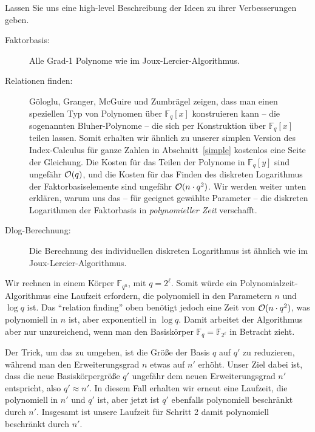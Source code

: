 \begin{refsegment}
Lassen Sie uns eine high-level Beschreibung der Ideen zu ihrer Verbesserungen geben.

\begin{description}
\item[Faktorbasis:] Alle Grad-1 Polynome wie im Joux-Lercier-Algorithmus.

\item[Relationen finden:] G\"ologlu, Granger, McGuire und Zumbr\"agel zeigen, dass man einen speziellen Typ von Polynomen über $\mathbb{F}_q[x]$ konstruieren kann -- die sogenannten Bluher-Polynome -- die sich per Konstruktion über $\mathbb{F}_q[x]$ teilen lassen. Somit erhalten wir ähnlich zu unserer simplen Version des Index-Calculus für ganze Zahlen in Abschnitt~\ref{simple} kostenlos eine Seite der Gleichung. Die Kosten für das Teilen der Polynome in $\mathbb{F}_q[y]$ sind ungefähr ${\cal O}(q)$, und die Kosten für das Finden des diskreten Logarithmus der Faktorbasiselemente sind ungefähr ${\cal O}(n \cdot q^2)$. Wir werden weiter unten erklären, warum uns das -- für geeignet gewählte Parameter -- die diskreten Logarithmen der Faktorbasis in {\em polynomieller Zeit} verschafft.

\item[Dlog-Berechnung:] Die Berechnung des individuellen diskreten Logarithmus ist ähnlich wie im Joux-Lercier-Algorithmus.
\end{description}

 Wir rechnen in einem Körper $\mathbb{F}_{q^n}$, mit $q=2^{\ell}$. Somit würde ein Polynomialzeit-Algorithmus eine Laufzeit erfordern, die polynomiell in den Parametern $n$ und $\log q$ ist. Das "`relation finding"' oben benötigt jedoch eine Zeit von ${\cal O}(n \cdot q^2)$, was polynomiell in $n$ ist, aber exponentiell in $\log q$. Damit arbeitet der Algorithmus aber nur unzureichend, wenn man den Basiskörper $\mathbb{F}_q = \mathbb{F}_{2^{\ell}}$ in Betracht zieht.

Der Trick, um das zu umgehen, ist die Größe der Basis $q$ auf $q'$ zu reduzieren, während man den Erweiterungsgrad $n$ etwas auf $n'$ erhöht. Unser Ziel dabei ist, dass die neue Basiskörpergröße $q'$ ungefähr dem neuen Erweiterungsgrad $n'$ entspricht, also $q' \approx n'$. In diesem Fall erhalten wir erneut eine Laufzeit, die polynomiell in $n'$ und $q'$ ist, aber jetzt ist $q'$ ebenfalls polynomiell beschränkt durch $n'$. Insgesamt ist unsere Laufzeit für Schritt 2 damit polynomiell beschränkt durch $n'$.\\[0.1cm]


\end{refsegment}
